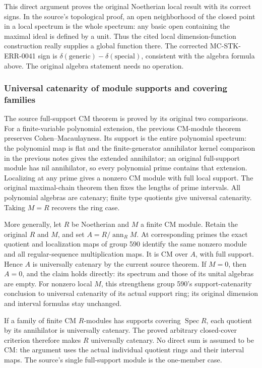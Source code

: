 This direct argument proves the original Noetherian local result with its correct signs. In the source's topological proof, an open neighborhood of the closed point in a local spectrum is the whole spectrum: any basic open containing the maximal ideal is defined by a unit. Thus the cited local dimension-function construction really supplies a global function there. The corrected MC-STK-ERR-0041 sign is \(\delta(\text{generic})-\delta(\text{special})\), consistent with the algebra formula above. The original algebra statement needs no operation.

\subsubsection{Universal catenarity of module supports and covering families}\label{algebra-proof-020-universal-catenarity-of-module-supports-and-covering-families}

The source full-support CM theorem is proved by its original two comparisons. For a finite-variable polynomial extension, the previous CM-module theorem preserves Cohen--Macaulayness. Its support is the entire polynomial spectrum: the polynomial map is flat and the finite-generator annihilator kernel comparison in the previous notes gives the extended annihilator; an original full-support module has nil annihilator, so every polynomial prime contains that extension. Localizing at any prime gives a nonzero CM module with full local support. The original maximal-chain theorem then fixes the lengths of prime intervals. All polynomial algebras are catenary; finite type quotients give universal catenarity. Taking \(M=R\) recovers the ring case.

More generally, let \(R\) be Noetherian and \(M\) a finite CM module. Retain the original \(R\) and \(M\), and set \(A=R/\operatorname{ann}_R M\). At corresponding primes the exact quotient and localization maps of group 590 identify the same nonzero module and all regular-sequence multiplication maps. It is CM over \(A\), with full support. Hence \(A\) is universally catenary by the current source theorem. If \(M=0\), then \(A=0\), and the claim holds directly: its spectrum and those of its unital algebras are empty. For nonzero local \(M\), this strengthens group 590's support-catenarity conclusion to universal catenarity of its actual support ring; its original dimension and interval formulas stay unchanged.

If a family of finite CM \(R\)-modules has supports covering \(\operatorname{Spec}R\), each quotient by its annihilator is universally catenary. The proved arbitrary closed-cover criterion therefore makes \(R\) universally catenary. No direct sum is assumed to be CM: the argument uses the actual individual quotient rings and their interval maps. The source's single full-support module is the one-member case.

